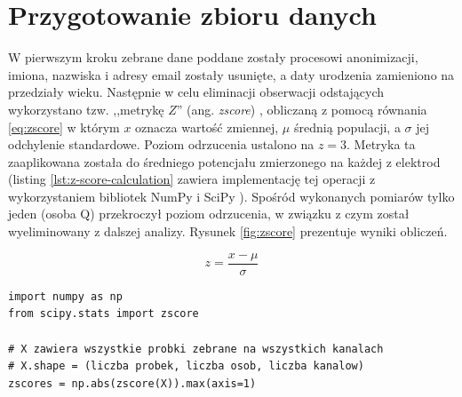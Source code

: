 \documentclass{./assets/wfis}
\begin{document}

\section{Przygotowanie zbioru danych}\label{data-preparation}



W pierwszym kroku zebrane dane poddane zostały procesowi anonimizacji, imiona, nazwiska i adresy email zostały usunięte, a
daty urodzenia zamieniono na przedziały wieku. Następnie w celu eliminacji obserwacji odstających wykorzystano tzw. ,,metrykę $Z$'' (ang. \textit{zscore}) \cite{noauthor_scipystatszscore_nodate}, obliczaną z pomocą równania \ref{eq:zscore} w którym $x$ oznacza wartość zmiennej, $\mu$ średnią populacji, a $\sigma$ jej odchylenie standardowe. Poziom odrzucenia ustalono na $z=3$. Metryka ta zaaplikowana została do średniego potencjału zmierzonego na każdej z elektrod (listing \ref{lst:z-score-calculation} zawiera implementację tej operacji z wykorzystaniem bibliotek NumPy \cite{harris_array_2020} i SciPy \cite{virtanen_scipy_2020}). Spośród wykonanych pomiarów tylko jeden (osoba Q) przekroczył poziom odrzucenia, w związku z czym został wyeliminowany z dalszej analizy. Rysunek \ref{fig:zscore} prezentuje wyniki obliczeń.

\begin{equation}
    z = \frac{x - \mu}{\sigma}
\end{equation}\label{eq:zscore}

\begin{lstlisting}[caption={Obliczanie standardyzacji Z},label={lst:z-score-calculation}]
import numpy as np
from scipy.stats import zscore

# X zawiera wszystkie probki zebrane na wszystkich kanalach
# X.shape = (liczba probek, liczba osob, liczba kanalow)
zscores = np.abs(zscore(X)).max(axis=1)
\end{lstlisting}
\end{document}
